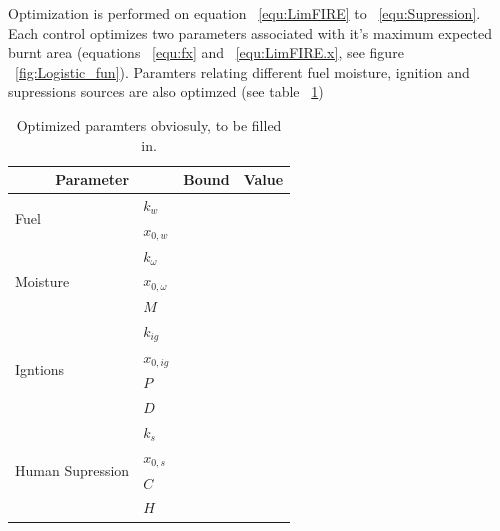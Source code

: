 Optimization is performed on equation ~\ref{equ:LimFIRE} to ~\ref{equ:Supression}. Each control optimizes two parameters associated with it's maximum expected burnt area (equations ~\ref{equ:fx} and ~\ref{equ:LimFIRE.x}, see figure ~\ref{fig:Logistic_fun}).
Paramters relating different fuel moisture, ignition and supressions sources are also optimzed (see table ~\ref{tab:optimize})

\begin{table}[]
\centering
\caption{Optimized paramters obviosuly, to be filled in.}
\label{tab:optimize}
\begin{tabular}{llll}
\hline
\multicolumn{2}{c}{\textbf{Parameter}} & \multicolumn{1}{c}{\textbf{Bound}} & \multicolumn{1}{c}{\textbf{Value}} \\ \hline
\multirow{2}{*}{Fuel}             & $k_{w}$         &                                    &                                    \\
                                  & $x_{0,w}$       &                                    &                                    \\ \hline
\multirow{3}{*}{Moisture}         & $k_{\omega}$    &                                    &                                    \\
                                  & $x_{0, \omega}$ &                                    &                                    \\
                                  & $M$             &                                    &                                    \\ \hline
\multirow{4}{*}{Igntions}         & $k_{ig}$        &                                    &                                    \\
                                  & $x_{0, ig}$     &                                    &                                    \\
                                  & $P$             &                                    &                                    \\
                                  & $D$             &                                    &                                    \\ \hline
\multirow{4}{*}{Human Supression} & $k_{s}$         &                                    &                                    \\
                                  & $x_{0, s}$      &                                    &                                    \\
                                  & $C$             &                                    &                                    \\
                                  & $H$             &                                    &                                    \\ \hline
\end{tabular}
\end{table}
